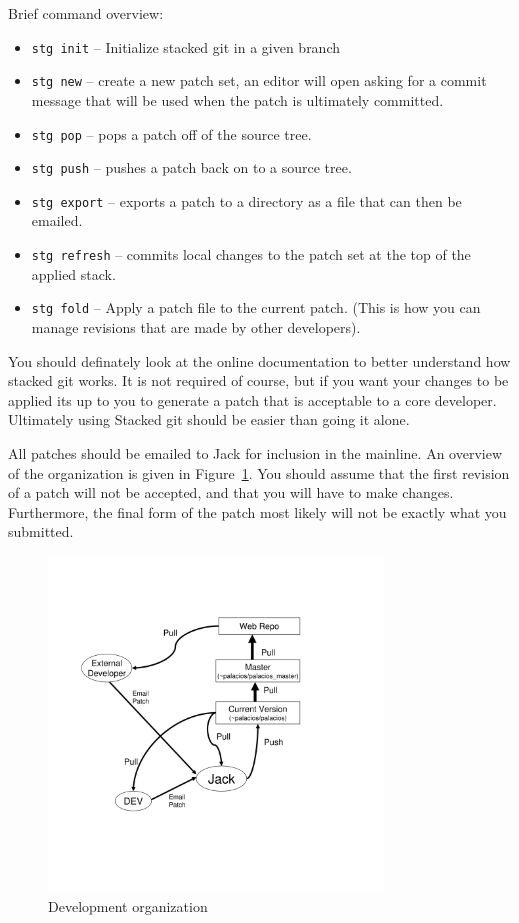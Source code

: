 \documentclass[11pt]{article}
\begin{document}
Brief command overview:
\begin{itemize}
\item \verb.stg init. -- Initialize stacked git in a given branch
\item \verb.stg new. -- create a new patch set, an editor will open
asking for a commit message that will be used when the patch is
ultimately committed.
\item \verb.stg pop. -- pops a patch off of the source tree.
\item \verb.stg push. -- pushes a patch back on to a source tree.
\item \verb.stg export. -- exports a patch to a directory as a file
that can then be emailed.
\item \verb.stg refresh. -- commits local changes to the patch set at
the top of the applied stack.
\item \verb.stg fold. -- Apply a patch file to the current
patch. (This is how you can manage revisions that are made by other developers).
\end{itemize}

You should definately look at the online documentation to better
understand how stacked git works. It is not required of course, but if
you want your changes to be applied its up to you to generate a patch
that is acceptable to a core developer. Ultimately using Stacked git
should be easier than going it alone.


All patches should be emailed to Jack for inclusion in the
mainline. An overview of the organization is given in
Figure~\ref{fig:process}. You should assume that the first revision of
a patch will not be accepted, and that you will have to make
changes. Furthermore, the final form of the patch most likely will not
be exactly what you submitted. 

 
\begin{figure}[t]
\begin{center}
\includegraphics[height=3.5in]{dev_chart.pdf}
\end{center}
\caption{Development organization}
\label{fig:process}
\end{figure}
\end{document}
